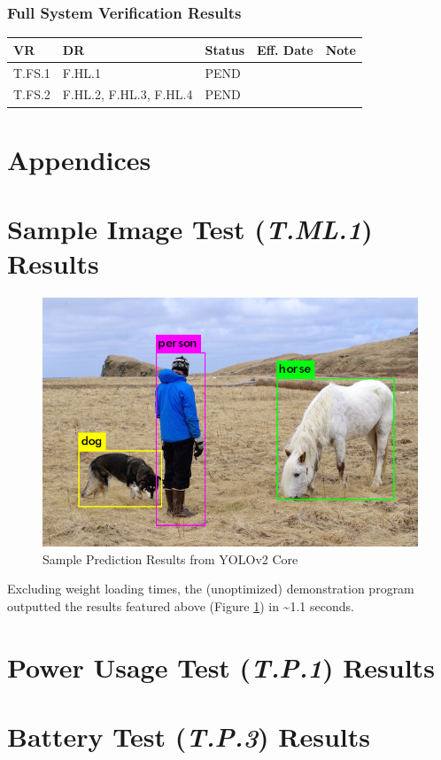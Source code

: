 \documentclass[10pt,letterpaper]{article}
\begin{document}
\subsubsection{Full System Verification Results}
\begin{table}[H]
	\centering
	\begin{tabular}{lllll}
	\hline
	\textbf{VR} & \textbf{DR} & \textbf{Status} & \textbf{Eff. Date} & \textbf{Note}\\
	\hline
    T.FS.1 & F.HL.1  & PEND   & \\
	T.FS.2 & F.HL.2, F.HL.3, F.HL.4 & PEND   & \\
	\hline
	\end{tabular}
\end{table}



\clearpage
{}



 \clearpage
 \appendix
 \section*{Appendices}
 \section{Sample Image Test (\textit{T.ML.1}) Results}\label{appendix:T.ML.1}
 
\begin{figure}[H]
\centering
\includegraphics[width=12.5cm]{img/pred.png}
\caption{Sample Prediction Results from YOLOv2 Core}
\label{ml_demo}
\end{figure} 
 
Excluding weight loading times, the (unoptimized) demonstration program outputted the results featured above (Figure \ref{ml_demo}) in \textasciitilde 1.1 seconds.
 
 \section{Power Usage Test (\textit{T.P.1}) Results}\label{appendix:T.P.1}
 
 \section{Battery Test (\textit{T.P.3}) Results}\label{appendix:T.P.3}
 

\end{document}
